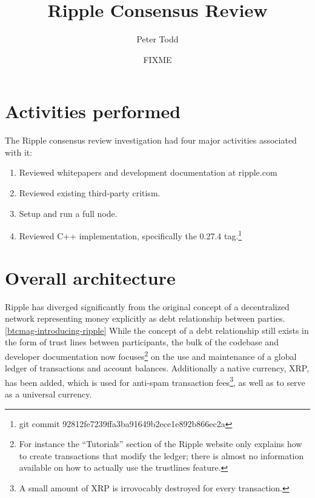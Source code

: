\documentclass{article}
\begin{document}
\title{Ripple Consensus Review}
\author{Peter Todd}
\date{FIXME}
\maketitle

\section{Activities performed}

The Ripple consensus review investigation had four major activities associated
with it:

\begin{enumerate}

    \item Reviewed whitepapers and development documentation at ripple.com

    \item Reviewed existing third-party critism.

    \item Setup and run a full node.

    \item Reviewed C++ implementation, specifically the 0.27.4 tag.\footnote{git commit 92812fe7239ffa3ba91649b2ece1e892b866ec2a}

\end{enumerate}


\section{Overall architecture}

Ripple has diverged significantly from the original concept of a decentralized
network representing money explicitly as debt relationship between
parties.\ref{btcmag-introducing-ripple} While the concept of a debt
relationship still exists in the form of trust lines between participants, the
bulk of the codebase and developer documentation now focuses\footnote{For
    instance the ``Tutorials'' section of the Ripple website only explains how
    to create transactions that modify the ledger; there is almost no information
available on how to actually use the trustlines feature.} on the use and
maintenance of a global ledger of transactions and account balances.
Additionally a native currency, XRP, has been added, which is used for
anti-spam transaction fees\footnote{A small amount of XRP is irrovocably
destroyed for every transaction.}, as well as to serve as a universal currency.
\end{document}

